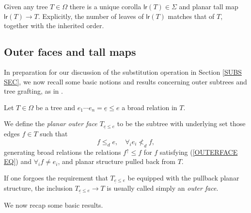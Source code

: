 \documentclass[a4paper,10pt]{article}%
\begin{document}
\begin{remark}\label{UNIQCOR REM}
  Given any tree $T \in \Omega$ there is a unique corolla $\mathsf{lr}(T) \in \Sigma$ and planar tall map 
  $\mathsf{lr}(T) \to T$.
  Explicitly, the number of leaves of $\mathsf{lr}(T)$ matches that of $T$, together with the inherited order. 
\end{remark}


\subsection{Outer faces and tall maps}\label{OUTTALL SEC}



In preparation for our discussion of the substitution operation in Section \ref{SUBS SEC}, we now recall some basic notions and results concerning outer subtrees and tree grafting, as in \cite[Section 5]{Pe17}.

\begin{definition}
  Let $T \in \Omega$ be a tree and 
  $e_1 \cdots e_n =\underline{e} \leq e$ a broad relation in $T$.
  
  We define the \textit{planar outer face $T_{\underline{e} \leq e}$}
  to be the subtree with underlying set those edges $f \in T$ such that
  \begin{equation}\label{OUTERFACE EQ}
    f \leq_d e,\quad \forall_i e_i \nless_d f,
  \end{equation}
  generating broad relations the relations $f^{\uparrow} \leq f$ for $f$ satisfying (\ref{OUTERFACE EQ}) and $\forall_i f\neq e_i$,
  and planar structure pulled back from $T$.
\end{definition}


\begin{remark}
  If one forgoes the requirement that $T_{\underline{e} \leq e}$ be equipped with the pullback planar structure, the inclusion $T_{\underline{e} \leq e} \to T$ is usually called simply an \textit{outer face}.
\end{remark}

We now recap some basic results.
\end{document}
